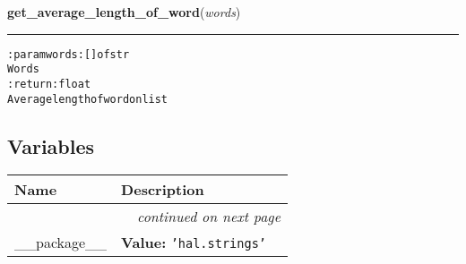     \label{hal:strings:utils:get_average_length_of_word}

    \vspace{0.5ex}

\hspace{.8\funcindent}\begin{boxedminipage}{\funcwidth}

    \raggedright \textbf{get\_average\_length\_of\_word}(\textit{words})

    \vspace{-1.5ex}

    \rule{\textwidth}{0.5\fboxrule}
\setlength{\parskip}{2ex}
\begin{alltt}

:param words: [] of str
    Words
:return: float
    Average length of word on list
\end{alltt}

\setlength{\parskip}{1ex}
    \end{boxedminipage}



  \subsection{Variables}

    \vspace{-1cm}
\hspace{\varindent}\begin{longtable}{|p{\varnamewidth}|p{\vardescrwidth}|l}
\cline{1-2}
\cline{1-2} \centering \textbf{Name} & \centering \textbf{Description}& \\
\cline{1-2}
\endhead\cline{1-2}\multicolumn{3}{r}{\small\textit{continued on next page}}\\\endfoot\cline{1-2}
\endlastfoot\raggedright \_\-\_\-p\-a\-c\-k\-a\-g\-e\-\_\-\_\- & \raggedright \textbf{Value:} 
{\tt \texttt{'}\texttt{hal.strings}\texttt{'}}&\\
\cline{1-2}
\end{longtable}

